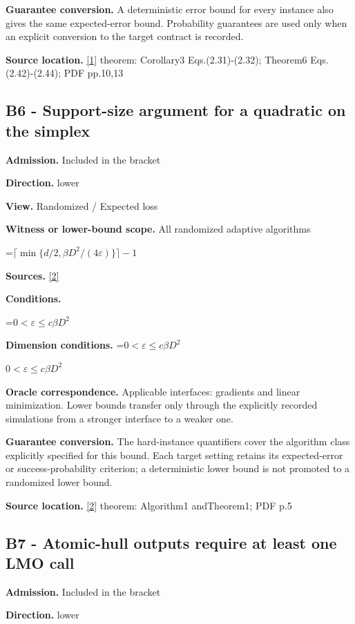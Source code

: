 \documentclass[10pt,a4paper]{article}
\newcommand{\AtlasMath}[1]{\par\begingroup\centering\setbox0=\hbox{$\displaystyle #1$}\ifdim\wd0>1.4\linewidth\typeout{ATLAS WIDE FORMULA: \the\wd0}\fi\ifdim\wd0>\linewidth\resizebox{\linewidth}{!}{\box0}\else\box0\fi\par\endgroup}
\newcommand{\AtlasInlineMath}[1]{\begingroup\setbox0=\hbox{$#1$}\ifdim\wd0>.4\linewidth\endgroup\AtlasMath{#1}\else\endgroup$#1$\fi}
\begin{document}
\textbf{Guarantee conversion.} A deterministic error bound for every instance also gives the same expected-error bound. Probability guarantees are used only when an explicit conversion to the target contract is recorded.

\textbf{Source location.} \href{https://optimization-online.org/wp-content/uploads/2014/10/4605.pdf}{[1]} theorem: Corollary3 Eqs.(2.31)-(2.32); Theorem6 Eqs.(2.42)-(2.44); PDF pp.10,13

\subsection{B6 - Support-size argument for a quadratic on the simplex}
\textbf{Admission.} Included in the bracket

\textbf{Direction.} lower

\textbf{View.} Randomized / Expected loss

\textbf{Witness or lower-bound scope.} All randomized adaptive algorithms

\AtlasMath{\lceil\min\{d/2,\beta D^2/(4\varepsilon)\}\rceil-1}
\textbf{Sources.} \href{https://arxiv.org/pdf/1309.5550}{[2]}

\textbf{Conditions.} 
\AtlasMath{0<\varepsilon\le c\beta D^2}


\textbf{Dimension conditions.} \AtlasInlineMath{0<\varepsilon\le c\beta D^2}

\textbf{Oracle correspondence.} Applicable interfaces: gradients and linear minimization. Lower bounds transfer only through the explicitly recorded simulations from a stronger interface to a weaker one.

\textbf{Guarantee conversion.} The hard-instance quantifiers cover the algorithm class explicitly specified for this bound. Each target setting retains its expected-error or success-probability criterion; a deterministic lower bound is not promoted to a randomized lower bound.

\textbf{Source location.} \href{https://arxiv.org/pdf/1309.5550}{[2]} theorem: Algorithm1 andTheorem1; PDF p.5

\subsection{B7 - Atomic-hull outputs require at least one LMO call}
\textbf{Admission.} Included in the bracket

\textbf{Direction.} lower
\end{document}

